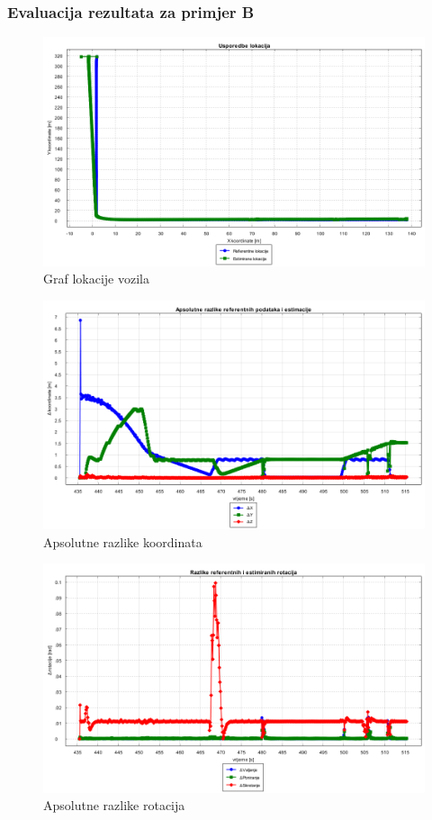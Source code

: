\subsubsection{Evaluacija rezultata za primjer B}
\begin{figure}[H]
  \includegraphics[scale=0.4]{images/algo1/primjer4/usporedba_lokacija.png}
  \caption{Graf lokacije vozila}
  \label{eval:a1p4_lokacija}
\end{figure}
\begin{figure}[H]
  \includegraphics[scale=0.4]{images/algo1/primjer4/apsolutne_razlike_koordinata.png}
  \caption{Apsolutne razlike koordinata}
  \label{eval:a1p4_koord_razlike}
\end{figure}
\begin{figure}[H]
  \includegraphics[scale=0.4]{images/algo1/primjer4/rotacije_razlike.png}
  \caption{Apsolutne razlike rotacija}
  \label{eval:a1p4_rot_razlike}
\end{figure}
